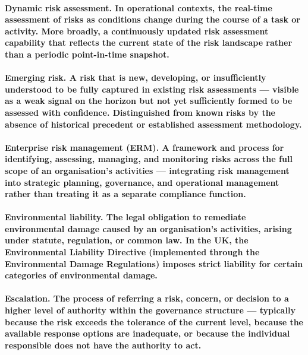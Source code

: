\paragraph{\textbf{Dynamic risk assessment}. In operational contexts, the real-time assessment of risks as conditions change during the course of a task or activity. More broadly, a continuously updated risk assessment capability that reflects the current state of the risk landscape rather than a periodic point-in-time snapshot.}

\paragraph{\textbf{Emerging risk}. A risk that is new, developing, or insufficiently understood to be fully captured in existing risk assessments — visible as a weak signal on the horizon but not yet sufficiently formed to be assessed with confidence. Distinguished from known risks by the absence of historical precedent or established assessment methodology.}

\paragraph{\textbf{Enterprise risk management (ERM)}. A framework and process for identifying, assessing, managing, and monitoring risks across the full scope of an organisation's activities — integrating risk management into strategic planning, governance, and operational management rather than treating it as a separate compliance function.}

\paragraph{\textbf{Environmental liability}. The legal obligation to remediate environmental damage caused by an organisation's activities, arising under statute, regulation, or common law. In the UK, the Environmental Liability Directive (implemented through the Environmental Damage Regulations) imposes strict liability for certain categories of environmental damage.}

\paragraph{\textbf{Escalation}. The process of referring a risk, concern, or decision to a higher level of authority within the governance structure — typically because the risk exceeds the tolerance of the current level, because the available response options are inadequate, or because the individual responsible does not have the authority to act.}

